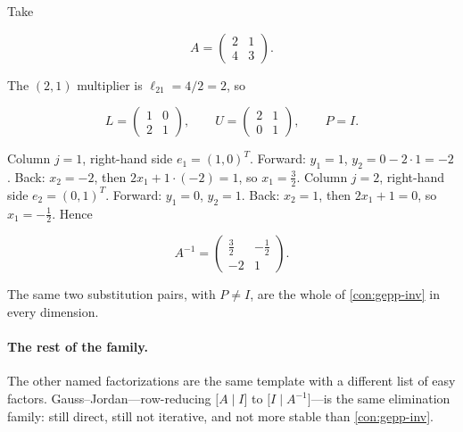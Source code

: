 \begin{example}
\label{ex:lu-2x2}
Take

\[
A
=
\begin{pmatrix}
2 & 1 \\
4 & 3
\end{pmatrix}.
\]

The \((2,1)\) multiplier is \(\ell_{21}=4/2=2\), so

\[
L
=
\begin{pmatrix}
1 & 0 \\
2 & 1
\end{pmatrix},
\qquad
U
=
\begin{pmatrix}
2 & 1 \\
0 & 1
\end{pmatrix},
\qquad
P=I.
\]

Column \(j=1\), right-hand side \(e_{1}=(1,0)^{T}\). Forward: \(y_{1}=1\), \(y_{2}=0-2\cdot 1=-2\). Back: \(x_{2}=-2\), then \(2x_{1}+1\cdot(-2)=1\), so \(x_{1}=\frac32\). Column \(j=2\), right-hand side \(e_{2}=(0,1)^{T}\). Forward: \(y_{1}=0\), \(y_{2}=1\). Back: \(x_{2}=1\), then \(2x_{1}+1=0\), so \(x_{1}=-\frac12\). Hence

\[
A^{-1}
=
\begin{pmatrix}
\tfrac32 & -\tfrac12 \\
-2 & 1
\end{pmatrix}.
\]

The same two substitution pairs, with \(P\neq I\), are the whole of \cref{con:gepp-inv} in every dimension.
\end{example}

\paragraph{The rest of the family.}

The other named factorizations are the same template with a different list of easy factors. Gauss--Jordan---row-reducing \(\bigl[A\mid I\bigr]\) to \(\bigl[I\mid A^{-1}\bigr]\)---is the same elimination family: still direct, still not iterative, and not more stable than \cref{con:gepp-inv}.

